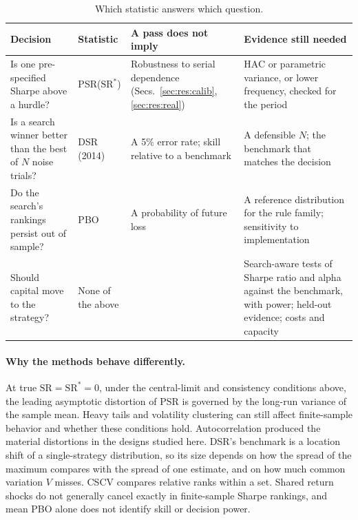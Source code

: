 \documentclass[11pt,a4paper]{article}
\newcommand{\SR}{\mathrm{SR}}
\begin{document}
\begin{table}[htbp]
\centering\small
\caption{Which statistic answers which question.}\label{tab:decision}
\begin{tabularx}{\textwidth}{@{}>{\raggedright\arraybackslash}p{3.4cm}>{\raggedright\arraybackslash}p{2.6cm}>{\raggedright\arraybackslash}X>{\raggedright\arraybackslash}X@{}}
\toprule
Decision & Statistic & A pass does not imply & Evidence still needed \\
\midrule
Is one pre-specified Sharpe above a hurdle? & PSR($\SR^\ast$) & Robustness to serial dependence (Secs.~\ref{sec:res:calib}, \ref{sec:res:real}) & HAC or parametric variance, or lower frequency, checked for the period \\
Is a search winner better than the best of $N$ noise trials? & DSR (2014) & A 5\% error rate; skill relative to a benchmark & A defensible $N$; the benchmark that matches the decision \\
Do the search's rankings persist out of sample? & PBO & A probability of future loss & A reference distribution for the rule family; sensitivity to implementation \\
Should capital move to the strategy? & None of the above & & Search-aware tests of Sharpe ratio and alpha against the benchmark, with power; held-out evidence; costs and capacity \\
\bottomrule
\end{tabularx}
\end{table}

\paragraph{Why the methods behave differently.} At true $\SR=\SR^\ast=0$, under the central-limit and consistency conditions above, the leading asymptotic distortion of PSR is governed by the long-run variance of the sample mean. Heavy tails and volatility clustering can still affect finite-sample behavior and whether these conditions hold. Autocorrelation produced the material distortions in the designs studied here. DSR's benchmark is a location shift of a single-strategy distribution, so its size depends on how the spread of the maximum compares with the spread of one estimate, and on how much common variation $V$ misses. CSCV compares relative ranks within a set. Shared return shocks do not generally cancel exactly in finite-sample Sharpe rankings, and mean PBO alone does not identify skill or decision power.
\end{document}
